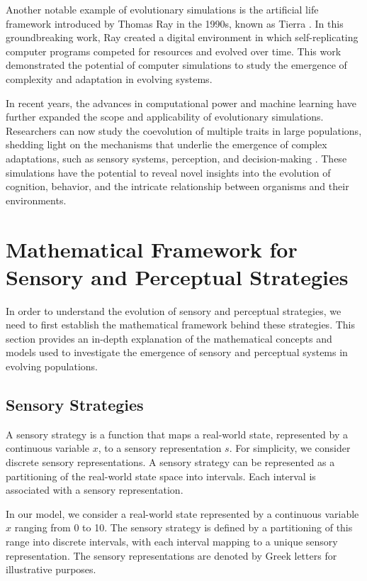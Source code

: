 \documentclass{article}[10pt]
\begin{document}
Another notable example of evolutionary simulations is the artificial life framework introduced by Thomas Ray in the 1990s, known as Tierra \cite{ray1992artificial}. In this groundbreaking work, Ray created a digital environment in which self-replicating computer programs competed for resources and evolved over time. This work demonstrated the potential of computer simulations to study the emergence of complexity and adaptation in evolving systems.

In recent years, the advances in computational power and machine learning have further expanded the scope and applicability of evolutionary simulations. Researchers can now study the coevolution of multiple traits in large populations, shedding light on the mechanisms that underlie the emergence of complex adaptations, such as sensory systems, perception, and decision-making \cite{hoffman2015interface}. These simulations have the potential to reveal novel insights into the evolution of cognition, behavior, and the intricate relationship between organisms and their environments.

\section{Mathematical Framework for Sensory and Perceptual Strategies}

In order to understand the evolution of sensory and perceptual strategies, we need to first establish the mathematical framework behind these strategies. This section provides an in-depth explanation of the mathematical concepts and models used to investigate the emergence of sensory and perceptual systems in evolving populations.

\subsection{Sensory Strategies}

A sensory strategy is a function that maps a real-world state, represented by a continuous variable $x$, to a sensory representation $s$. For simplicity, we consider discrete sensory representations. A sensory strategy can be represented as a partitioning of the real-world state space into intervals. Each interval is associated with a sensory representation.

In our model, we consider a real-world state represented by a continuous variable $x$ ranging from 0 to 10. The sensory strategy is defined by a partitioning of this range into discrete intervals, with each interval mapping to a unique sensory representation. The sensory representations are denoted by Greek letters for illustrative purposes.
\end{document}
